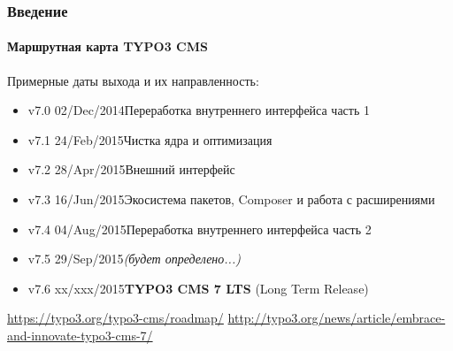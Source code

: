 \begin{frame}[fragile]
	\frametitle{Введение}
	\framesubtitle{Маршрутная карта TYPO3 CMS}

	Примерные даты выхода и их направленность:

	\begin{itemize}
		\item v7.0 \tabto{1.0cm}02/Dec/2014\tabto{3.4cm}Переработка внутреннего интерфейса часть 1
		\item v7.1 \tabto{1.0cm}24/Feb/2015\tabto{3.4cm}Чистка ядра и оптимизация
		\item v7.2 \tabto{1.0cm}28/Apr/2015\tabto{3.4cm}Внешний интерфейс

		\item
			\begingroup
				\color{typo3orange}
					v7.3 \tabto{1.0cm}16/Jun/2015\tabto{3.4cm}Экосистема пакетов, Composer\newline
                    \tabto{3.4cm}и работа с расширениями
			\endgroup

		\item v7.4 \tabto{1.0cm}04/Aug/2015\tabto{3.4cm}Переработка внутреннего интерфейса часть 2
		\item v7.5 \tabto{1.0cm}29/Sep/2015\tabto{3.4cm}\textit{(будет определено...)}
		\item v7.6 \tabto{1.0cm}xx/xxx/2015\tabto{3.4cm}\textbf{TYPO3 CMS 7 LTS} (Long Term Release)
	\end{itemize}

	\smaller
		\url{https://typo3.org/typo3-cms/roadmap/}\newline
		\url{http://typo3.org/news/article/embrace-and-innovate-typo3-cms-7/}
	\normalsize

\end{frame}

